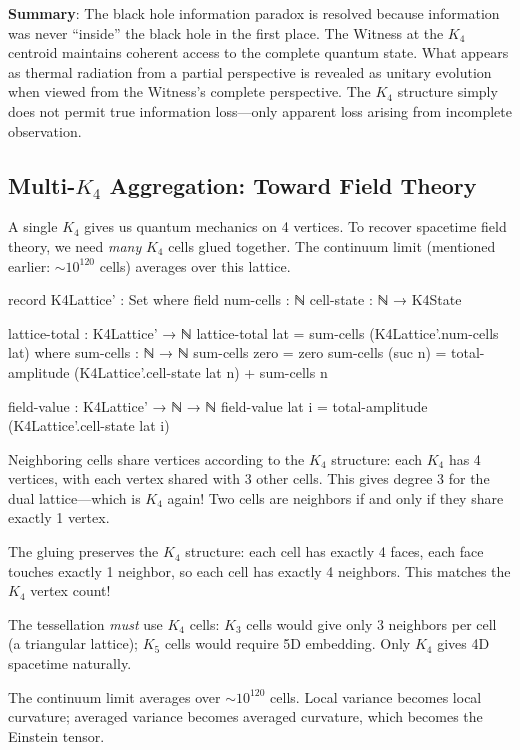 \documentclass[11pt,a4paper]{book}
\begin{document}
\textbf{Summary}: The black hole information paradox is resolved because 
information was never ``inside'' the black hole in the first place. The Witness at the $K_4$
centroid maintains coherent access to the complete quantum state. What appears
as thermal radiation from a partial perspective is revealed as unitary
evolution when viewed from the Witness's complete perspective. The $K_4$
structure simply does not permit true information loss---only apparent loss arising from
incomplete observation.

\subsection{Multi-$K_4$ Aggregation: Toward Field Theory}

A single $K_4$ gives us quantum mechanics on 4 vertices. To recover 
spacetime field theory, we need \emph{many} $K_4$ cells glued together.
The continuum limit (mentioned earlier: $\sim 10^{120}$ cells) averages
over this lattice.

\begin{code}
record K4Lattice' : Set where
  field
    num-cells : ℕ
    cell-state : ℕ → K4State
    
lattice-total : K4Lattice' → ℕ
lattice-total lat = sum-cells (K4Lattice'.num-cells lat) 
  where
    sum-cells : ℕ → ℕ
    sum-cells zero = zero
    sum-cells (suc n) = total-amplitude (K4Lattice'.cell-state lat n) + sum-cells n

field-value : K4Lattice' → ℕ → ℕ
field-value lat i = total-amplitude (K4Lattice'.cell-state lat i)
\end{code}

Neighboring cells share vertices according to the $K_4$ structure: each $K_4$ has 4 vertices, with each vertex shared with 3 other cells. This gives degree 3 for the dual lattice---which is $K_4$ again! Two cells are neighbors if and only if they share exactly 1 vertex.

The gluing preserves the $K_4$ structure: each cell has exactly 4 faces, each face touches exactly 1 neighbor, so each cell has exactly 4 neighbors. This matches the $K_4$ vertex count!

The tessellation \emph{must} use $K_4$ cells: $K_3$ cells would give only 3 neighbors per cell (a triangular lattice); $K_5$ cells would require 5D embedding. Only $K_4$ gives 4D spacetime naturally.

The continuum limit averages over $\sim 10^{120}$ cells. Local variance becomes local curvature; averaged variance becomes averaged curvature, which becomes the Einstein tensor.
\end{document}
